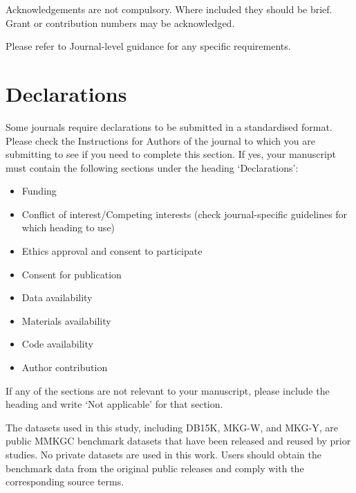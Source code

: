 \documentclass[pdflatex,sn-mathphys-num]{sn-jnl}%
\theoremstyle{thmstyleone}%
\theoremstyle{thmstyletwo}%
\theoremstyle{thmstylethree}%
\begin{document}
Acknowledgements are not compulsory. Where included they should be brief. Grant or contribution numbers may be acknowledged.

Please refer to Journal-level guidance for any specific requirements.

\section*{Declarations}

Some journals require declarations to be submitted in a standardised format. Please check the Instructions for Authors of the journal to which you are submitting to see if you need to complete this section. If yes, your manuscript must contain the following sections under the heading `Declarations':

\begin{itemize}
\item Funding
\item Conflict of interest/Competing interests (check journal-specific guidelines for which heading to use)
\item Ethics approval and consent to participate
\item Consent for publication
\item Data availability 
\item Materials availability
\item Code availability 
\item Author contribution
\end{itemize}

\noindent
If any of the sections are not relevant to your manuscript, please include the heading and write `Not applicable' for that section. 


The datasets used in this study, including DB15K, MKG-W, and MKG-Y, are public MMKGC benchmark datasets that have been released and reused by prior studies. No private datasets are used in this work. Users should obtain the benchmark data from the original public releases and comply with the corresponding source terms.

\end{document}
